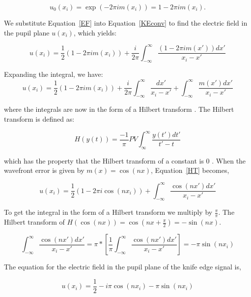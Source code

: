 \begin{equation}
    u_0(x_i )=\exp(-2\pi i m(x_i ))=1-2\pi i m(x_i).
    \label{EF}
\end{equation}

We substitute Equation~\ref{EF} into Equation~\ref{KEconv} to find the electric field in the pupil plane $u(x_i)$, which yields:

\begin{equation}
    u(x_i)= \frac{1}{2}(1-2\pi i m(x_i))+\frac{i}{2\pi}\int_{-\infty}^\infty \frac{(1-2\pi i m(x'))dx'}{x_i-x'}
    \label{HT}
\end{equation}

Expanding the integral, we have:
\begin{equation}
    u(x_i)= \frac{1}{2}(1-2\pi i m(x_i))+\frac{i}{2\pi}\int_{-\infty}^\infty \frac{dx'}{x_i-x'}+\int_{-\infty}^\infty \frac{ m(x')dx'}{x_i-x'}
\end{equation}

\noindent where the integrals are now in the form of a Hilbert transform \citep{villa2014foucault}. The Hilbert transform is defined as:

\begin{equation}
    H(y(t))=\frac{-1}{\pi} PV\int_{\infty}^{\infty} \frac{y(t') dt'}{t'-t}
\end{equation}

\noindent which has the property that the Hilbert transform of a constant is 0 \citep{poularikas2018handbook}. When the wavefront error is given by $m(x)=\cos(nx)$, Equation~\ref{HT} becomes, 


\begin{equation}
    u(x_i)= \frac{1}{2}(1-2\pi i \cos(nx_i))+\int_{-\infty}^\infty \frac{ \cos(nx')dx'}{x_i-x'}
\end{equation}

To get the integral in the form of a Hilbert transform we multiply by $\frac{\pi}{\pi}$. The Hilbert transform of $H(\cos(nx))=\cos(nx+\frac{\pi}{2})=-\sin(nx)$.

\begin{equation}
\int_{-\infty}^\infty \frac{ \cos(nx')dx'}{x_i-x'}=\pi*[\frac{1}{\pi}\int_{-\infty}^\infty \frac{ \cos(nx')dx'}{x_i-x'}]=-\pi \sin(nx_i)
\end{equation}

The equation for the electric field in the pupil plane of the knife edge signal is,

\begin{equation}
   u(x_i)= \frac{1}{2}-i \pi \cos(nx_i) -\pi \sin(nx_i)
   \label{derivationResult}
\end{equation}

